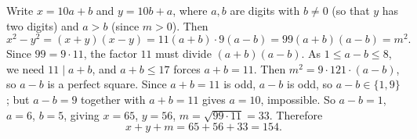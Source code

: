 Write \(x=10a+b\) and \(y=10b+a\), where \(a,b\) are digits with \(b\ne0\) (so that \(y\) has two digits) and \(a>b\) (since \(m>0\)). Then
\[
x^2-y^2=(x+y)(x-y)=11(a+b)\cdot9(a-b)=99(a+b)(a-b)=m^2 .
\]
Since \(99=9\cdot11\), the factor \(11\) must divide \((a+b)(a-b)\). As \(1\le a-b\le8\), we need \(11\mid a+b\), and \(a+b\le17\) forces \(a+b=11\). Then \(m^2=9\cdot121\cdot(a-b)\), so \(a-b\) is a perfect square. Since \(a+b=11\) is odd, \(a-b\) is odd, so \(a-b\in\{1,9\}\); but \(a-b=9\) together with \(a+b=11\) gives \(a=10\), impossible. So \(a-b=1\), \(a=6\), \(b=5\), giving \(x=65\), \(y=56\), \(m=\sqrt{99\cdot11}=33\). Therefore
\[
x+y+m=65+56+33=\boxed{154}.
\]
